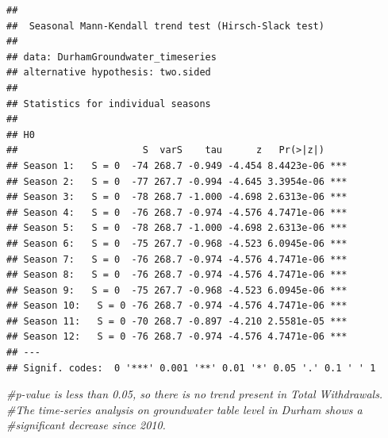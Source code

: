 \documentclass[
  12pt,
]{article}
\newenvironment{Shaded}{\begin{snugshade}}{\end{snugshade}}
\newcommand{\AttributeTok}[1]{\textcolor[rgb]{0.77,0.63,0.00}{#1}}
\newcommand{\CommentTok}[1]{\textcolor[rgb]{0.56,0.35,0.01}{\textit{#1}}}
\newcommand{\DecValTok}[1]{\textcolor[rgb]{0.00,0.00,0.81}{#1}}
\newcommand{\FunctionTok}[1]{\textcolor[rgb]{0.00,0.00,0.00}{#1}}
\newcommand{\NormalTok}[1]{#1}
\newcommand{\OtherTok}[1]{\textcolor[rgb]{0.56,0.35,0.01}{#1}}
\newcommand{\SpecialCharTok}[1]{\textcolor[rgb]{0.00,0.00,0.00}{#1}}
\newcommand{\StringTok}[1]{\textcolor[rgb]{0.31,0.60,0.02}{#1}}
\begin{document}
\begin{verbatim}
## 
##  Seasonal Mann-Kendall trend test (Hirsch-Slack test)
## 
## data: DurhamGroundwater_timeseries
## alternative hypothesis: two.sided
## 
## Statistics for individual seasons
## 
## H0
##                      S  varS    tau      z   Pr(>|z|)    
## Season 1:   S = 0  -74 268.7 -0.949 -4.454 8.4423e-06 ***
## Season 2:   S = 0  -77 267.7 -0.994 -4.645 3.3954e-06 ***
## Season 3:   S = 0  -78 268.7 -1.000 -4.698 2.6313e-06 ***
## Season 4:   S = 0  -76 268.7 -0.974 -4.576 4.7471e-06 ***
## Season 5:   S = 0  -78 268.7 -1.000 -4.698 2.6313e-06 ***
## Season 6:   S = 0  -75 267.7 -0.968 -4.523 6.0945e-06 ***
## Season 7:   S = 0  -76 268.7 -0.974 -4.576 4.7471e-06 ***
## Season 8:   S = 0  -76 268.7 -0.974 -4.576 4.7471e-06 ***
## Season 9:   S = 0  -75 267.7 -0.968 -4.523 6.0945e-06 ***
## Season 10:   S = 0 -76 268.7 -0.974 -4.576 4.7471e-06 ***
## Season 11:   S = 0 -70 268.7 -0.897 -4.210 2.5581e-05 ***
## Season 12:   S = 0 -76 268.7 -0.974 -4.576 4.7471e-06 ***
## ---
## Signif. codes:  0 '***' 0.001 '**' 0.01 '*' 0.05 '.' 0.1 ' ' 1
\end{verbatim}

\begin{Shaded}
\begin{Highlighting}[]
\CommentTok{\#p{-}value is less than 0.05, so there is no trend present in Total Withdrawals.}
\CommentTok{\#The time{-}series analysis on groundwater table level in Durham shows a }
\CommentTok{\#significant decrease since 2010. }
\end{Highlighting}
\end{Shaded}

\begin{Shaded}
\end{Shaded}
\end{document}

